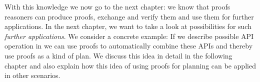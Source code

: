 With this knowledge we now go to the next chapter: we know that proofs \nthree reasoners can produce proofs, exchange and verify them and use them for further applications. 
In the next chapter, we want to take a look at possibilities for such \emph{further applications}. We consider a concrete example: If we describe possible API operation in \nthree we can 
use proofs to automatically combine these APIs and thereby use proofs as a kind of plan. We discuss this idea in detail in the following chapter and also explain how this  idea of 
using proofs for planning can be applied in other scenarios.
